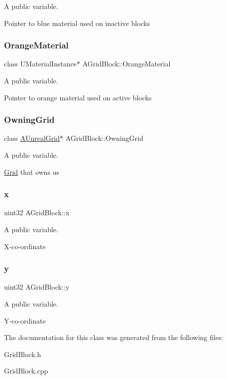 A public variable. 

Pointer to blue material used on inactive blocks \hypertarget{class_a_grid_block_a4a396f418bffcef7a96b40e387cfd927}{}\label{class_a_grid_block_a4a396f418bffcef7a96b40e387cfd927} 
\subsubsection{\texorpdfstring{Orange\+Material}{OrangeMaterial}}
{\footnotesize\ttfamily class U\+Material\+Instance$\ast$ A\+Grid\+Block\+::\+Orange\+Material}



A public variable. 

Pointer to orange material used on active blocks \hypertarget{class_a_grid_block_af3dc096c5f96aba9b3b882f3f11deb93}{}\label{class_a_grid_block_af3dc096c5f96aba9b3b882f3f11deb93} 
\subsubsection{\texorpdfstring{Owning\+Grid}{OwningGrid}}
{\footnotesize\ttfamily class \hyperlink{class_a_unreal_grid}{A\+Unreal\+Grid}$\ast$ A\+Grid\+Block\+::\+Owning\+Grid}



A public variable. 

\hyperlink{class_grid}{Grid} that owns us \hypertarget{class_a_grid_block_a8050ae31d3015e14fcae9d553977cea1}{}\label{class_a_grid_block_a8050ae31d3015e14fcae9d553977cea1} 
\subsubsection{\texorpdfstring{x}{x}}
{\footnotesize\ttfamily uint32 A\+Grid\+Block\+::x}



A public variable. 

X-\/co-\/ordinate \hypertarget{class_a_grid_block_aad833bb2a47f65ef3cbba7940687c819}{}\label{class_a_grid_block_aad833bb2a47f65ef3cbba7940687c819} 
\subsubsection{\texorpdfstring{y}{y}}
{\footnotesize\ttfamily uint32 A\+Grid\+Block\+::y}



A public variable. 

Y-\/co-\/ordinate 

The documentation for this class was generated from the following files\+:\begin{DoxyCompactItemize}
\item 
Grid\+Block.\+h\item 
Grid\+Block.\+cpp\end{DoxyCompactItemize}
